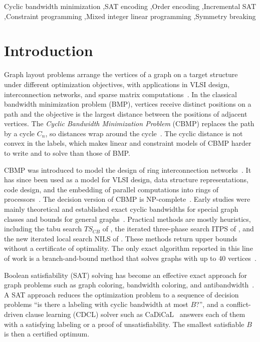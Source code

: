 \documentclass[a4paper,fleqn]{cas-sc}
\begin{document}
\begin{keywords}
Cyclic bandwidth minimization \sep SAT encoding \sep Order encoding \sep Incremental SAT \sep Constraint programming \sep Mixed integer linear programming \sep Symmetry breaking
\end{keywords}

\maketitle

\section{Introduction}
\label{sec:intro}

Graph layout problems arrange the vertices of a graph on a target structure under different optimization objectives, with applications in VLSI design, interconnection networks, and sparse matrix computations~\citep{leung1984,hromkovic1992,duff1989}. In the classical bandwidth minimization problem (BMP), vertices receive distinct positions on a path and the objective is the largest distance between the positions of adjacent vertices. The \emph{Cyclic Bandwidth Minimization Problem} (CBMP) replaces the path by a cycle $C_n$, so distances wrap around the cycle~\citep{leung1984,lin1994}. The cyclic distance is not convex in the labels, which makes linear and constraint models of CBMP harder to write and to solve than those of BMP.

CBMP was introduced to model the design of ring interconnection networks~\citep{leung1984}. It has since been used as a model for VLSI design, data structure representations, code design, and the embedding of parallel computations into rings of processors~\citep{hromkovic1992,ren2020nils}. The decision version of CBMP is NP-complete~\citep{lin1994}. Early studies were mainly theoretical and established exact cyclic bandwidths for special graph classes and bounds for general graphs~\citep{hromkovic1992,lin1994}. Practical methods are mostly heuristics, including the tabu search $TS_{CB}$ of \citet{rodrigueztello2015}, the iterated three-phase search ITPS of \citet{ren2019}, and the new iterated local search NILS of \citet{ren2020nils}. These methods return upper bounds without a certificate of optimality. The only exact algorithm reported in this line of work is a branch-and-bound method that solves graphs with up to 40 vertices~\citep{romero2012}.

Boolean satisfiability (SAT) solving has become an effective exact approach for graph problems such as graph coloring, bandwidth coloring, and antibandwidth~\citep{handbooksat2021,prestwich2009,tamura2009}. A SAT approach reduces the optimization problem to a sequence of decision problems ``is there a labeling with cyclic bandwidth at most $B$?'', and a conflict-driven clause learning (CDCL) solver such as CaDiCaL~\citep{biere2024} answers each of them with a satisfying labeling or a proof of unsatisfiability. The smallest satisfiable $B$ is then a certified optimum.
\end{document}
